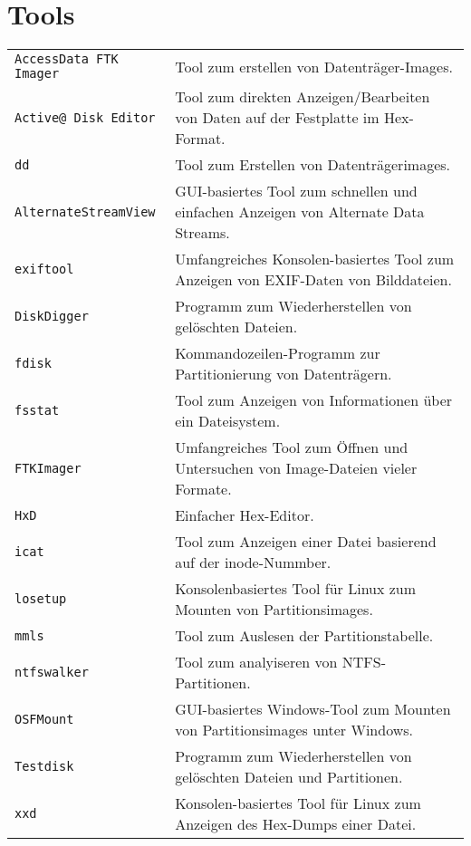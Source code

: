 \section{Tools}
\begin{tabular}{@{}p{\the\MyLen}
	@{}p{\linewidth-\the\MyLen}@{}}
	\texttt{AccessData FTK Imager}   & Tool zum erstellen von Datenträger-Images.                                          \\
	\texttt{Active@ Disk Editor}     & Tool zum direkten Anzeigen/Bearbeiten von Daten auf der Festplatte im Hex-Format.   \\
	\texttt{dd}                      & Tool zum Erstellen von Datenträgerimages.                                           \\
	\texttt{Alternate\-Stream\-View} & GUI-basiertes Tool zum schnellen und einfachen Anzeigen von Alternate Data Streams. \\
	\texttt{exiftool}                & Umfangreiches Konsolen-basiertes Tool zum Anzeigen von EXIF-Daten von Bilddateien.  \\
	\texttt{DiskDigger}              & Programm zum Wiederherstellen von gelöschten Dateien.                               \\
	\texttt{fdisk}                   & Kommandozeilen-Programm zur Partitionierung von Datenträgern.                       \\
	\texttt{fsstat}                  & Tool zum Anzeigen von Informationen über ein Dateisystem.                           \\
	\texttt{FTKImager}               & Umfangreiches Tool zum Öffnen und Untersuchen von Image-Dateien vieler Formate.     \\
	\texttt{HxD}                     & Einfacher Hex-Editor.                                                               \\
	\texttt{icat}                    & Tool zum Anzeigen einer Datei basierend auf der inode-Nummber.                      \\
	\texttt{losetup}                 & Konsolenbasiertes Tool für Linux zum Mounten von Partitionsimages.                  \\
	\texttt{mmls}                    & Tool zum Auslesen der Partitionstabelle.                                            \\
	\texttt{ntfswalker}              & Tool zum analyiseren von NTFS-Partitionen.                                          \\
	\texttt{OSFMount}                & GUI-basiertes Windows-Tool zum Mounten von Partitionsimages unter Windows.          \\
	\texttt{Testdisk}                & Programm zum Wiederherstellen von gelöschten Dateien und Partitionen.               \\
	\texttt{xxd}                     & Konsolen-basiertes Tool für Linux zum Anzeigen des Hex-Dumps einer Datei.           \\
\end{tabular}
